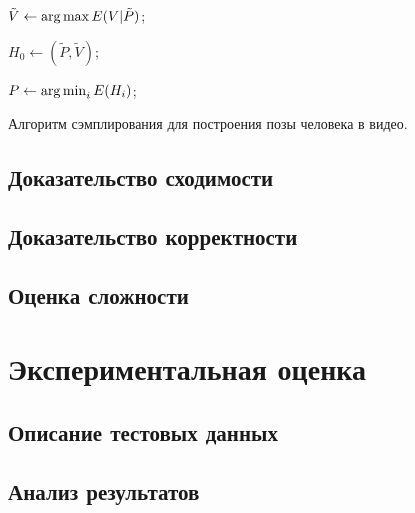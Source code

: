 \begin{algorithm}[H]
	\SetAlgoLined %
	
	
	
	$\tilde{V} \leftarrow \operatorname*{arg\,max}{E(V|\tilde{P})}$;
	
	$H_0 \leftarrow \left(\tilde{P}, \tilde{V} \right)$;
	

	$P \leftarrow \operatorname*{arg\,min}_i{E(H_i)}$;
	
	\caption{Алгоритм сэмплирования для построения позы человека в видео.}
	\label{alg:generalHM}
\end{algorithm}

\subsection{Доказательство сходимости}
\subsection{Доказательство корректности}
\subsection{Оценка сложности}
\section{Экспериментальная оценка}
\subsection{Описание тестовых данных}
\subsection{Анализ результатов}
